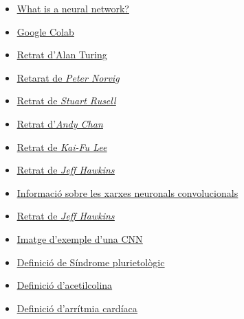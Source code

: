 \documentclass[a4paper,12pt]{report}
\begin{document}
\begin{itemize}
    \item \href{https://aws.amazon.com/es/what-is/neural-network/}{\underline{What is a neural network?}}
    \item \href{https://colab.research.google.com/}{\underline{Google Colab}}
    \item \href{https://upload.wikimedia.org/wikipedia/commons/a/a1/Alan_Turing_Aged_16.jpg}{\underline{Retrat d'Alan Turing}}
    \item \href{https://cs.berkeley.edu/sites/default/files/news_image/peter_norvig_speaking_at_university_of_california_berkeley_2013.jpg}{\underline{Retarat de \textit{Peter Norvig}}}
    \item \href{https://cs.berkeley.edu/sites/default/files/eecs_tout/russell-aqua.jpg}{\underline{Retrat de \textit{Stuart Rusell}}}
    \item \href{https://media.licdn.com/dms/image/C5603AQHgogiTxs2TZg/profile-displayphoto-shrink_800_800/0/1565701087600?e=2147483647&v=beta&t=p5ZjgearbT6mUGtGi2AEwDY07gaEWxmlGYDypO0HUVU}{\underline{Retrat d'\textit{Andy Chan}}}
    \item \href{https://upload.wikimedia.org/wikipedia/commons/0/0d/Capture_medium.jpg}{\underline{Retrat de \textit{Kai-Fu Lee}}}
    \item \href{https://m.media-amazon.com/images/W/IMAGERENDERING_521856-T1/images/S/amzn-author-media-prod/b2a43a485uokuohjp5l7peo9f0.jpg}{\underline{Retrat de \textit{Jeff Hawkins}}}
    \item \href{https://keepcoding.io/blog/redes-neuronales-convolucionales/#Que_son_las_Redes_Neuronales_Convolucionales}{\underline{Informació sobre les xarxes neuronals convolucionals}}
    \item \href{https://m.media-amazon.com/images/S/amzn-author-media-prod/b2a43a485uokuohjp5l7peo9f0._SX450_.jpg}{\underline{Retrat de \textit{Jeff Hawkins}}}
    \item \href{https://editor.analyticsvidhya.com/uploads/25366Convolutional_Neural_Network_to_identify_the_image_of_a_bird.png}{\underline{Imatge d'exemple d'una CNN}}
    \item \href{https://es.wikipedia.org/wiki/Síndrome}{\underline{ Definició de Síndrome plurietològic}}
    \item \href{https://www.cancer.gov/espanol/publicaciones/diccionarios/diccionario-cancer/def/acetilcolina}{\underline{Definició d'acetilcolina}}
    \item \href{https://medlineplus.gov/spanish/ency/article/001101.htm#:~:text=Es%20un%20trastorno%20de%20la,peligro%20inmediato%20para%20su%20salud.}{\underline{Definició d'arrítmia cardíaca}}

\end{itemize}
\end{document}
